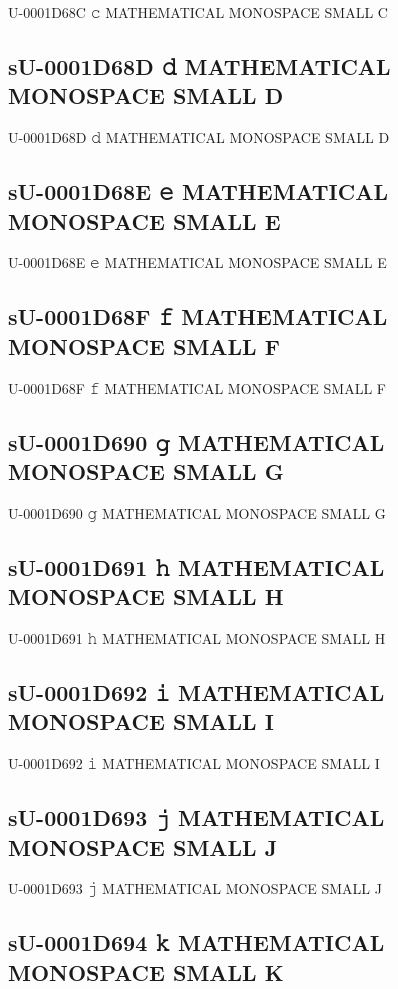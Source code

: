 U-0001D68C 𝚌 MATHEMATICAL MONOSPACE SMALL C

\subsection{sU-0001D68D 𝚍 MATHEMATICAL MONOSPACE SMALL D}

U-0001D68D 𝚍 MATHEMATICAL MONOSPACE SMALL D

\subsection{sU-0001D68E 𝚎 MATHEMATICAL MONOSPACE SMALL E}

U-0001D68E 𝚎 MATHEMATICAL MONOSPACE SMALL E

\subsection{sU-0001D68F 𝚏 MATHEMATICAL MONOSPACE SMALL F}

U-0001D68F 𝚏 MATHEMATICAL MONOSPACE SMALL F

\subsection{sU-0001D690 𝚐 MATHEMATICAL MONOSPACE SMALL G}

U-0001D690 𝚐 MATHEMATICAL MONOSPACE SMALL G

\subsection{sU-0001D691 𝚑 MATHEMATICAL MONOSPACE SMALL H}

U-0001D691 𝚑 MATHEMATICAL MONOSPACE SMALL H

\subsection{sU-0001D692 𝚒 MATHEMATICAL MONOSPACE SMALL I}

U-0001D692 𝚒 MATHEMATICAL MONOSPACE SMALL I

\subsection{sU-0001D693 𝚓 MATHEMATICAL MONOSPACE SMALL J}

U-0001D693 𝚓 MATHEMATICAL MONOSPACE SMALL J

\subsection{sU-0001D694 𝚔 MATHEMATICAL MONOSPACE SMALL K}

